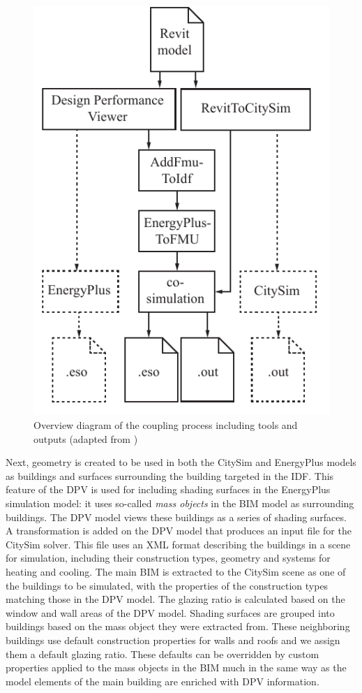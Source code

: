 \documentclass{tBPS2e}
\theoremstyle{plain}
\theoremstyle{definition}
\theoremstyle{remark}
\begin{document}
\begin{figure}[H]
\centering
\includegraphics[scale=0.7]{figures/UMEM_Workflow}
\caption{Overview diagram of the coupling process including tools and outputs (adapted from \cite{thomas2014multiscale})}
\label{fig:OverallWorkflowProcess}
\end{figure}

Next, geometry is created to be used in both the CitySim and EnergyPlus models as buildings and surfaces surrounding the building targeted in the IDF. This feature of the DPV is used for including shading surfaces in the EnergyPlus simulation model: it uses so-called \emph{mass objects} in the BIM model as surrounding buildings. The DPV model views these buildings as a series of shading surfaces. A transformation is added on the DPV model that produces an input file for the CitySim solver. This file uses an XML format describing the buildings in a scene for simulation, including their construction types, geometry and systems for heating and cooling. The main BIM is extracted to the CitySim scene as one of the buildings to be simulated, with the properties of the construction types matching those in the DPV model. The glazing ratio is calculated based on the window and wall areas of the DPV model. Shading surfaces are grouped into buildings based on the mass object they were extracted from. These neighboring buildings use default construction properties for walls and roofs and we assign them a default glazing ratio. These defaults can be overridden by custom properties applied to the mass objects in the BIM much in the same way as the model elements of the main building are enriched with DPV information. 
\end{document}
